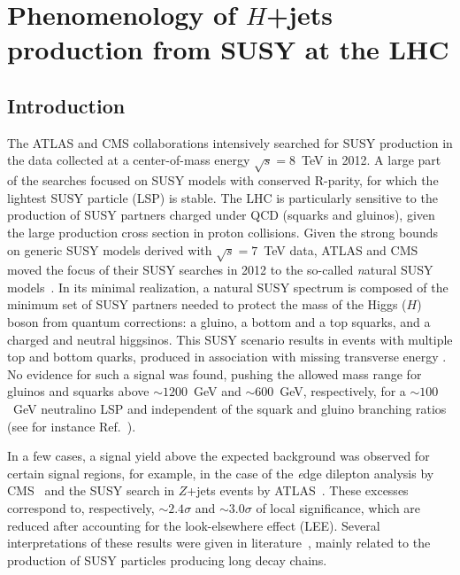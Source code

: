 \chapter{Phenomenology of $H$+jets production from SUSY at the LHC}
\label{ch:pheno}
\section{Introduction}
The ATLAS and CMS collaborations intensively searched for SUSY production in the data collected at a center-of-mass energy $\sqrt{s}=8$~TeV in 2012. A large part of the searches focused on SUSY models with conserved R-parity, for which the lightest SUSY particle (LSP) is stable. The LHC is particularly sensitive to the production of SUSY partners charged under QCD (squarks and gluinos), given the large production cross section in proton collisions. Given the strong bounds on generic SUSY models derived with $\sqrt{s}=7$~TeV data, ATLAS and CMS moved the focus of their SUSY searches in 2012 to the so-called {\textit natural} SUSY models~\cite{Papucci:2011wy}. In its minimal realization, a natural SUSY spectrum is composed of the minimum set of SUSY partners needed to protect the mass of the Higgs ($H$) boson from quantum corrections: a gluino, a bottom and a top squarks, and a charged and neutral higgsinos. This SUSY scenario results in events with multiple top and bottom quarks, produced in association with missing transverse energy \met. No evidence for such a signal was found, pushing the allowed mass range for gluinos and squarks above $\sim 1200$~GeV and $\sim 600$~GeV, respectively, for a $\sim 100$~GeV neutralino LSP and independent of the squark and gluino branching ratios (see for instance Ref.~\cite{razor8TeVPRD}). 

In a few cases, a signal yield above the expected background was observed for certain signal regions, for example, in the case of the {\textit edge} dilepton analysis by CMS~\cite{CMSedge} and the SUSY search in $Z$+jets events by ATLAS~\cite{ATLASZpeak}. These excesses correspond to, respectively, $\sim 2.4\sigma$ and $\sim 3.0\sigma$ of local significance, which are reduced after accounting for the look-elsewhere effect (LEE). Several interpretations of these results were given in literature~\cite{Theory1,Theory2,Theory3,Theory4,Theory5,Theory6}, mainly related to the production of SUSY particles producing long decay chains. 


